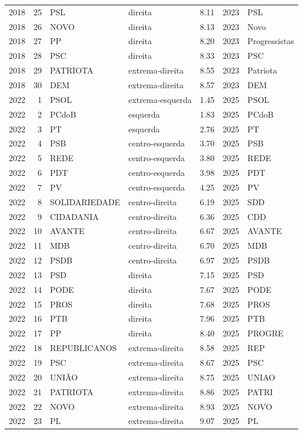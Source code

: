 \begin{longtable}{rrlllrl}
2018 & 25 & PSL & direita & 8.11 & 2023 & PSL \\
2018 & 26 & NOVO & direita & 8.13 & 2023 & Novo \\
2018 & 27 & PP & direita & 8.20 & 2023 & Progressistas \\
2018 & 28 & PSC & direita & 8.33 & 2023 & PSC \\
2018 & 29 & PATRIOTA & extrema-direita & 8.55 & 2023 & Patriota \\
2018 & 30 & DEM & extrema-direita & 8.57 & 2023 & DEM \\
2022 & 1 & PSOL & extrema-esquerda & 1.45 & 2025 & PSOL \\
2022 & 2 & PCdoB & esquerda & 1.83 & 2025 & PCdoB \\
2022 & 3 & PT & esquerda & 2.76 & 2025 & PT \\
2022 & 4 & PSB & centro-esquerda & 3.70 & 2025 & PSB \\
2022 & 5 & REDE & centro-esquerda & 3.80 & 2025 & REDE \\
2022 & 6 & PDT & centro-esquerda & 3.98 & 2025 & PDT \\
2022 & 7 & PV & centro-esquerda & 4.25 & 2025 & PV \\
2022 & 8 & SOLIDARIEDADE & centro-direita & 6.19 & 2025 & SDD \\
2022 & 9 & CIDADANIA & centro-direita & 6.36 & 2025 & CDD \\
2022 & 10 & AVANTE & centro-direita & 6.67 & 2025 & AVANTE \\
2022 & 11 & MDB & centro-direita & 6.70 & 2025 & MDB \\
2022 & 12 & PSDB & centro-direita & 6.97 & 2025 & PSDB \\
2022 & 13 & PSD & direita & 7.15 & 2025 & PSD \\
2022 & 14 & PODE & direita & 7.67 & 2025 & PODE \\
2022 & 15 & PROS & direita & 7.68 & 2025 & PROS \\
2022 & 16 & PTB & direita & 7.96 & 2025 & PTB \\
2022 & 17 & PP & direita & 8.40 & 2025 & PROGRE \\
2022 & 18 & REPUBLICANOS & extrema-direita & 8.58 & 2025 & REP \\
2022 & 19 & PSC & extrema-direita & 8.67 & 2025 & PSC \\
2022 & 20 & UNIÃO & extrema-direita & 8.75 & 2025 & UNIAO \\
2022 & 21 & PATRIOTA & extrema-direita & 8.86 & 2025 & PATRI \\
2022 & 22 & NOVO & extrema-direita & 8.93 & 2025 & NOVO \\
2022 & 23 & PL & extrema-direita & 9.07 & 2025 & PL \\
\bottomrule
\end{longtable}
